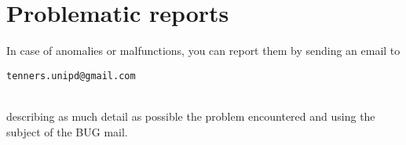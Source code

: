 \section{Problematic reports}
In case of anomalies or malfunctions, you can report them by sending an email to\\
\centerline {\texttt{tenners.unipd@gmail.com}}\\
describing as much detail as possible the problem encountered and using the subject of the BUG mail.